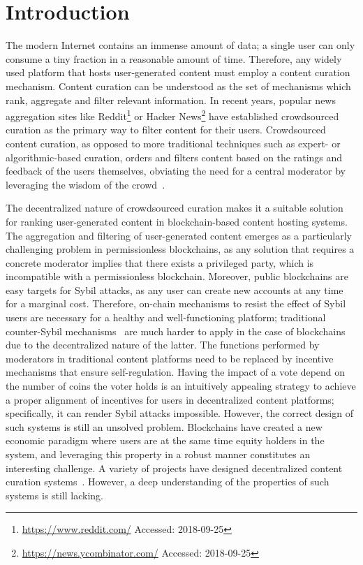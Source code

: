 \section{Introduction}
  The modern Internet contains an immense amount of data; a single user can only consume a tiny fraction in a reasonable amount of time. Therefore, any widely used platform that hosts user-generated content must employ a content curation mechanism.
   Content curation can be understood as the set of mechanisms which rank, aggregate and filter relevant information. In recent years, popular news aggregation sites like Reddit\footnote{\url{https://www.reddit.com/} Accessed: 2018-09-25} or Hacker News\footnote{\url{https://news.ycombinator.com/} Accessed: 2018-09-25} have established crowdsourced curation as the primary way to filter content for their users.
   Crowdsourced content curation, as opposed to more traditional techniques such as expert- or algorithmic-based curation, orders and filters content based on the ratings and feedback of the users themselves, obviating the need for a central moderator by leveraging the wisdom of the crowd~\cite{askalidis2013theoretical}.

  The decentralized nature of crowdsourced curation makes it a suitable solution for ranking user-generated content in blockchain-based content hosting systems. The aggregation and filtering of user-generated content emerges as a particularly challenging problem in permissionless blockchains, as any solution that requires a concrete moderator implies that there exists a privileged party, which is incompatible with a permissionless blockchain.
   Moreover, public blockchains are easy targets for Sybil attacks, as any user can create new accounts at any time for a marginal cost.
    Therefore, on-chain mechanisms to resist the effect of Sybil users are necessary for a healthy and well-functioning platform; traditional counter-Sybil mechanisms~\cite{levine2006survey} are much harder to apply in the case of blockchains due to the decentralized nature of the latter.
   The functions performed by moderators in traditional content platforms need to be replaced by incentive mechanisms that ensure self-regulation. Having the impact of a vote depend on the number of coins the voter holds is an intuitively appealing strategy to achieve a proper alignment of incentives for users in decentralized content platforms; specifically, it can render Sybil attacks impossible.
   However, the correct design of such systems is still an unsolved problem. Blockchains have created a new economic paradigm where users are at the same time equity holders in the system, and leveraging this property in a robust manner constitutes an interesting challenge.
   A variety of projects have designed decentralized content curation systems~\cite{synereo,steemit,tcr}. However, a deep understanding of the properties of such systems is still lacking.

